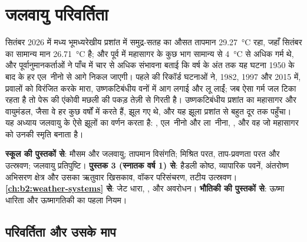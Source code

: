 \chapter{जलवायु परिवर्तिता}\label{ch:b2:climate-variability}

सितंबर 2026 में मध्य भूमध्यरेखीय प्रशांत में समुद्र-सतह का औसत तापमान \qty{29.27}{\celsius} रहा,
जहाँ सितंबर का सामान्य मान \qty{26.71}{\celsius} है; और पूर्व में महासागर के कुछ भाग सामान्य से
\qty{4}{\celsius} से अधिक गर्म थे, और पूर्वानुमानकर्ताओं ने पाँच में चार से अधिक
संभावना बताई कि वर्ष के अंत तक यह घटना 1950 के बाद के हर एल~नीनो से आगे निकल जाएगी। पहले की
रिकॉर्ड घटनाओं ने, 1982, 1997 और 2015 में, प्रवालों को विरंजित करके मारा, उष्णकटिबंधीय वनों में आग लगाई
और लू लाईं; जब ऐसा गर्म जल टिका रहता है तो पेरू की एंकोवी मछली की पकड़ तेज़ी से गिरती है।
उष्णकटिबंधीय प्रशांत का महासागर और वायुमंडल, जैसा वे हर कुछ वर्षों में करते हैं, झूल गए थे, और यह
झूला प्रशांत से बहुत दूर तक पहुँचा। यह अध्याय जलवायु के ऐसे झूलों का वर्णन करता है: , एल~नीनो
और ला~नीना, , और वह जो महासागर को उनकी
स्मृति बनाता है।

\begin{recall}
\textbf{स्कूल की पुस्तकों से}: मौसम और जलवायु; तापमान विसंगति; मिश्रित परत,
ताप-प्रवणता परत और उत्स्रवण; जलवायु प्रतिपुष्टि। \textbf{पुस्तक 3 (स्नातक वर्ष 1) से}: हैडली
कोष्ठ, व्यापारिक पवनें, अंतरोष्ण अभिसरण क्षेत्र और उसका ऋतुवार खिसकाव, वॉकर
परिसंचरण, तटीय उत्स्रवण। \textbf{\cref{ch:b2:weather-systems} से}: जेट धारा,
,  और अवरोधन। \textbf{भौतिकी की पुस्तकों से}: ऊष्मा धारिता
और ऊष्मागतिकी का पहला नियम।
\end{recall}

\section{परिवर्तिता और उसके माप}\label{sec:b2:climate-variability:measures}

